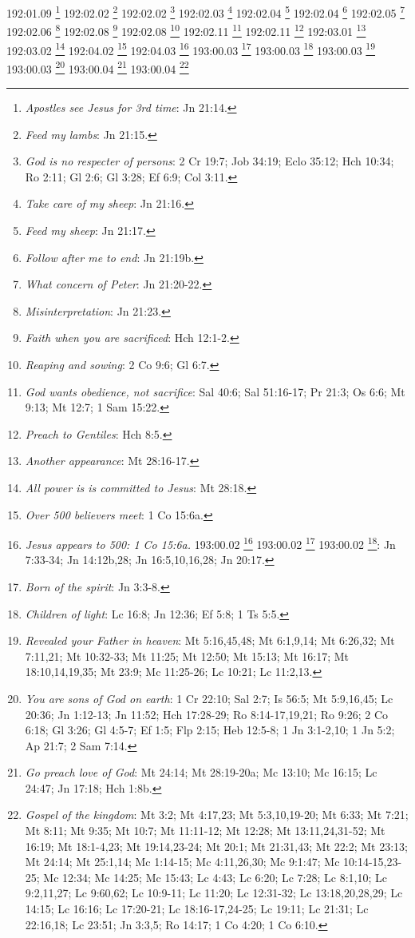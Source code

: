 192:01.09 \footnote{\textit{Apostles see Jesus for 3rd time}: Jn 21:14.}
192:02.02 \footnote{\textit{Feed my lambs}: Jn 21:15.}
192:02.02 \footnote{\textit{God is no respecter of persons}: 2 Cr 19:7; Job 34:19; Eclo 35:12; Hch 10:34; Ro 2:11; Gl 2:6; Gl 3:28; Ef 6:9; Col 3:11.}
192:02.03 \footnote{\textit{Take care of my sheep}: Jn 21:16.}
192:02.04 \footnote{\textit{Feed my sheep}: Jn 21:17.}
192:02.04 \footnote{\textit{Follow after me to end}: Jn 21:19b.}
192:02.05 \footnote{\textit{What concern of Peter}: Jn 21:20-22.}
192:02.06 \footnote{\textit{Misinterpretation}: Jn 21:23.}
192:02.08 \footnote{\textit{Faith when you are sacrificed}: Hch 12:1-2.}
192:02.08 \footnote{\textit{Reaping and sowing}: 2 Co 9:6; Gl 6:7.}
192:02.11 \footnote{\textit{God wants obedience, not sacrifice}: Sal 40:6; Sal 51:16-17; Pr 21:3; Os 6:6; Mt 9:13; Mt 12:7; 1 Sam 15:22.}
192:02.11 \footnote{\textit{Preach to Gentiles}: Hch 8:5.}
192:03.01 \footnote{\textit{Another appearance}: Mt 28:16-17.}
192:03.02 \footnote{\textit{All power is is committed to Jesus}: Mt 28:18.}
192:04.02 \footnote{\textit{Over 500 believers meet}: 1 Co 15:6a.}
192:04.03 \footnote{\textit{Jesus appears to 500: 1 Co 15:6a.}
193:00.02 \footnote{\textit{Jesus' discourse to leaders}: Lc 24:44-48.}
193:00.02 \footnote{\textit{Told of death & resurrection}: Mt 16:21; Mt 17:22-23a; Mt 20:17-19; Mt 27:63; Mc 8:31; Mc 9:31; Mc 10:32-34; Lc 9:22,31,43b-44; Lc 18:31-33; Lc 24:7,46; Jn 14:28a; Jn 20:9.}
193:00.02 \footnote{\textit{Told}: Jesus must return to Father}: Jn 7:33-34; Jn 14:12b,28; Jn 16:5,10,16,28; Jn 20:17.}
193:00.03 \footnote{\textit{Born of the spirit}: Jn 3:3-8.}
193:00.03 \footnote{\textit{Children of light}: Lc 16:8; Jn 12:36; Ef 5:8; 1 Ts 5:5.}
193:00.03 \footnote{\textit{Revealed your Father in heaven}: Mt 5:16,45,48; Mt 6:1,9,14; Mt 6:26,32; Mt 7:11,21; Mt 10:32-33; Mt 11:25; Mt 12:50; Mt 15:13; Mt 16:17; Mt 18:10,14,19,35; Mt 23:9; Mc 11:25-26; Lc 10:21; Lc 11:2,13.}
193:00.03 \footnote{\textit{You are sons of God on earth}: 1 Cr 22:10; Sal 2:7; Is 56:5; Mt 5:9,16,45; Lc 20:36; Jn 1:12-13; Jn 11:52; Hch 17:28-29; Ro 8:14-17,19,21; Ro 9:26; 2 Co 6:18; Gl 3:26; Gl 4:5-7; Ef 1:5; Flp 2:15; Heb 12:5-8; 1 Jn 3:1-2,10; 1 Jn 5:2; Ap 21:7; 2 Sam 7:14.}
193:00.04 \footnote{\textit{Go preach love of God}: Mt 24:14; Mt 28:19-20a; Mc 13:10; Mc 16:15; Lc 24:47; Jn 17:18; Hch 1:8b.}
193:00.04 \footnote{\textit{Gospel of the kingdom}: Mt 3:2; Mt 4:17,23; Mt 5:3,10,19-20; Mt 6:33; Mt 7:21; Mt 8:11; Mt 9:35; Mt 10:7; Mt 11:11-12; Mt 12:28; Mt 13:11,24,31-52; Mt 16:19; Mt 18:1-4,23; Mt 19:14,23-24; Mt 20:1; Mt 21:31,43; Mt 22:2; Mt 23:13; Mt 24:14; Mt 25:1,14; Mc 1:14-15; Mc 4:11,26,30; Mc 9:1:47; Mc 10:14-15,23-25; Mc 12:34; Mc 14:25; Mc 15:43; Lc 4:43; Lc 6:20; Lc 7:28; Lc 8:1,10; Lc 9:2,11,27; Lc 9:60,62; Lc 10:9-11; Lc 11:20; Lc 12:31-32; Lc 13:18,20,28,29; Lc 14:15; Lc 16:16; Lc 17:20-21; Lc 18:16-17,24-25; Lc 19:11; Lc 21:31; Lc 22:16,18; Lc 23:51; Jn 3:3,5; Ro 14:17; 1 Co 4:20; 1 Co 6:10.}
